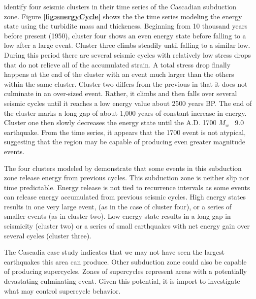 \documentclass[]{proposalnsf}
\begin{document}
 \citet{Goldfinger2013} identify four seismic clusters in their time series of the Cascadian subduction zone. Figure {\bf \ref{fig:energyCycle}} shows the the time series modeling the energy state using the turbidite mass and thickeness. Beginning from 10 thousand years before present (1950), cluster four shows an even energy state before falling to a low after a large event. Cluster three climbs steadily until falling to a similar low. During this period there are several seismic cycles with relatively low stress drops that do not relieve all of the accumulated strain. A total stress drop finally happens at the end of the cluster with an event much larger than the others within the same cluster. Cluster two differs from the previous in that it does not culminate in an over-sized event. Rather, it climbs and then falls over several seismic cycles until it reaches a low energy value about 2500 years BP. The end of the cluster marks a long gap of about 1,000 years of constant increase in energy. Cluster one then slowly decreases the energy state until the A.D. 1700 $M_w$ ~9.0 earthquake. From the time series, it appears that the 1700 event is not atypical, suggesting that the region may be capable of producing even greater magnitude events. 

The four clusters modeled by \citet{Goldfinger2013} demonstrate that some events in this subduction zone release energy from previous cycles. This subduction zone is neither slip nor time predictable. Energy release is not tied to recurrence intervals as some events can release energy accumulated from previous seismic cycles. High energy states results in one very large event, (as in the case of cluster four), or a series of smaller events (as in cluster two). Low energy state results in a long gap in seismicity (cluster two) or a series of small earthquakes with net energy gain over several cycles (cluster three). 

The Cascadia case study indicates that we may not have seen the largest earthquakes this area can produce. Other subduction zone could also be capable of producing supercycles. Zones of supercycles represent areas with a potentially devastating culminating event. Given this potential, it is import to investigate what may control supercycle behavior.
\end{document}

